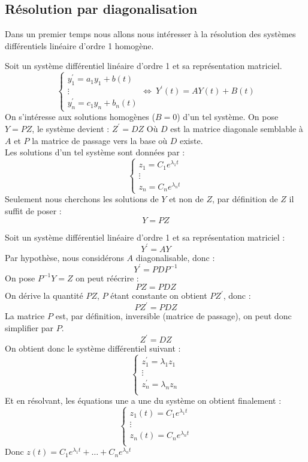 \subsection{Résolution par diagonalisation}
Dans un premier temps nous allons nous intéresser à la résolution des systèmes différentiels linéaire d'ordre 1 homogène.
\begin{thm}[Théorème]
Soit un système différentiel linéaire d'ordre 1 et sa représentation matriciel.
$$
\begin{cases}
y_1^{\prime}=a_1 y_1 + b(t)\\
\vdots\\
y_{n}^{\prime}=c_1 y_n + b_n(t)
\end{cases}\Leftrightarrow\ Y^{\prime}(t)=AY(t)+B(t)$$
On s'intéresse aux solutions homogènes ($B=0$) d'un tel système.
On pose $Y=PZ$, le système devient : $Z^{\prime}=DZ$
Où $D$ est la matrice diagonale semblable à $A$ 
 et $P$ la matrice de passage vers la base où $D$ existe.\\
Les solutions d'un tel système sont données par :
$$\begin{cases}
z_1=C_1e^{\lambda_1 t}\\
\vdots\\
z_n=C_ne^{\lambda_n t}
\end{cases}$$
Seulement nous cherchons les solutions de $Y$ et non de $Z$, par définition de $Z$ il suffit de poser :
$$Y=PZ$$
\end{thm}
\begin{demo}
Soit un système différentiel linéaire d'ordre 1 et sa représentation matriciel :
$$Y^{\prime}=AY$$
Par hypothèse, nous considérons $A$ diagonalisable, donc :
$$Y^{\prime}=PDP^{-1}$$
On pose $P^{-1}Y=Z$ on peut réécrire : 
$$PZ=PDZ$$
On dérive la quantité $PZ$, $P$ étant constante on obtient $PZ^{\prime}$, donc :
$$PZ^{\prime}=PDZ$$
La matrice $P$ est, par définition, inversible (matrice de passage), on peut donc simplifier par $P$.
$$Z^{\prime}=DZ$$
On obtient donc le système différentiel suivant :
$$\begin{cases}
z_1^{\prime}=\lambda_1 z_1\\
\vdots\\
z_n^{\prime}=\lambda_n z_n\\
\end{cases}$$
Et en résolvant, les équations une a une du système on obtient finalement :
$$\begin{cases}
z_1(t)=C_1 e^{\lambda_1 t}\\
\vdots\\
z_n(t)=C_n e^{\lambda_n t}\\
\end{cases}$$
Donc $z(t)=C_1 e^{\lambda_1 t}+\hdots+C_n e^{\lambda_n t}$
\end{demo}
